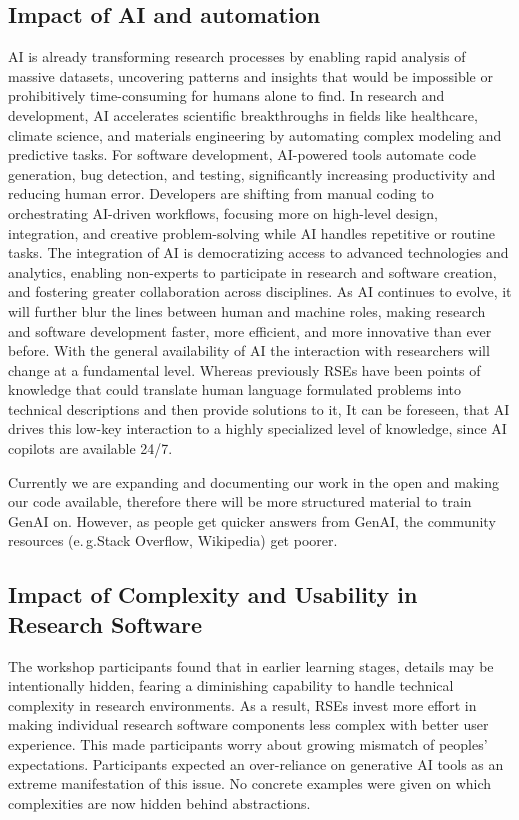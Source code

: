 \documentclass{eceasst}
\newcommand{\eg}{e.\,g.}
\begin{document}
\subsection{Impact of AI and automation}
AI is already transforming research processes by enabling rapid analysis of massive datasets, uncovering patterns and insights that would be impossible or prohibitively time-consuming for humans alone to find.
In research and development, AI accelerates scientific breakthroughs in fields like healthcare, climate science, and materials engineering by automating complex modeling and predictive tasks.
For software development, AI-powered tools automate code generation, bug detection, and testing, significantly increasing productivity and reducing human error.
Developers are shifting from manual coding to orchestrating AI-driven workflows, focusing more on high-level design, integration, and creative problem-solving while AI handles repetitive or routine tasks.
The integration of AI is democratizing access to advanced technologies and analytics, enabling non-experts to participate in research and software creation, and fostering greater collaboration across disciplines.
As AI continues to evolve, it will further blur the lines between human and machine roles, making research and software development faster, more efficient, and more innovative than ever before.
With the general availability of AI the interaction with researchers will change at a fundamental level.
Whereas previously RSEs have been points of knowledge that could translate human language formulated problems into technical descriptions and then provide solutions to it,
It can be foreseen, that AI drives this low-key interaction to a highly specialized level of knowledge,
since AI copilots are available 24/7.

Currently we are expanding and documenting our work in the open and making our code available,
therefore there will be more structured material to train GenAI on.
However, as people get quicker answers from GenAI, the community resources (\eg Stack Overflow, Wikipedia)
get poorer.

\subsection{Impact of Complexity and Usability in Research Software}

The workshop participants found that in earlier learning stages,
details may be intentionally hidden,
fearing a diminishing capability to handle technical complexity in research environments.
As a result, RSEs invest more effort in making individual research software components
less complex with better user experience.
This made participants worry about growing mismatch of peoples' expectations.
Participants expected an over-reliance on generative AI tools as an extreme manifestation of this issue.
No concrete examples were given on which complexities are now hidden behind abstractions.
\end{document}

